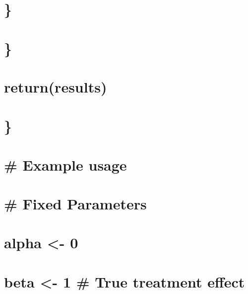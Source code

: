 \documentclass[
]{article}
\begin{document}
\hypertarget{section-23}{%
\section{\}}\label{section-23}}

\hypertarget{section-24}{%
\section{\}}\label{section-24}}

\hypertarget{section-25}{%
\section{}\label{section-25}}

\hypertarget{returnresults}{%
\section{return(results)}\label{returnresults}}

\hypertarget{section-26}{%
\section{\}}\label{section-26}}

\hypertarget{section-27}{%
\section{}\label{section-27}}

\hypertarget{example-usage}{%
\section{\# Example usage}\label{example-usage}}

\hypertarget{fixed-parameters}{%
\section{\# Fixed Parameters}\label{fixed-parameters}}

\hypertarget{alpha---0}{%
\section{alpha \textless- 0}\label{alpha---0}}

\hypertarget{beta---1-true-treatment-effect}{%
\section{beta \textless- 1 \# True treatment
effect}\label{beta---1-true-treatment-effect}}
\end{document}
